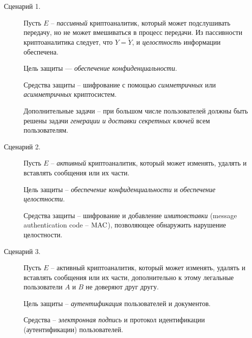 \begin{description}
    \item[Сценарий 1.] Пусть $E$ -- \emph{пассивный} криптоаналитик, который может подслушивать передачу, но не может вмешиваться в процесс передачи. Из пассивности криптоаналитика следует, что $Y = \widetilde{Y}$, и \emph{целостность} информации обеспечена.

Цель защиты --- \emph{обеспечение конфиденциальности}.

Средства защиты -- шифрование с помощью \emph{симметричных} или \emph{асимметричных } криптосистем.

Дополнительные задачи -- при большом числе пользователей должны быть решены задачи \emph{генерации и доставки секретных ключей} всем пользователям.

    \item[Сценарий 2.] Пусть $E$ -- \emph{активный} криптоаналитик, который может изменять, удалять и вставлять сообщения или их части.

    Цель защиты -- \emph{обеспечение конфиденциальности} и \emph{обеспечение целостности}.

Средства защиты -- шифрование и добавление \emph{имитовставки} (message authentication code -- $\textrm{MAC}$), позволяющее обнаружить нарушение целостности.

    \item[Сценарий 3.] Пусть $E$ -- активный криптоаналитик, который может изменять, удалять и вставлять сообщения или их части, дополнительно к этому легальные пользователи $A$ и $B$ не доверяют друг другу.

Цель защиты -- \emph{аутентификация} пользователей и документов.

Средства -- \emph{электронная подпись} и протокол идентификации (аутентификации) пользователей.
\end{description}

%
